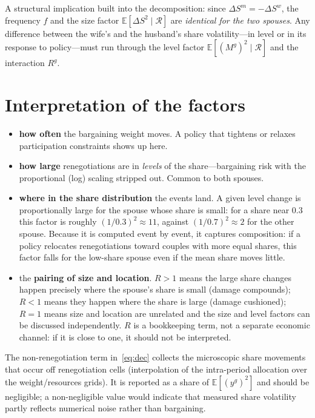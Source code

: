 \documentclass[11pt]{article}
\newcommand{\E}{\mathbb{E}}
\newcommand{\ren}{\mathcal{R}}
\begin{document}
A structural implication built into the decomposition: since
$\Delta S^m = -\Delta S^w$, the frequency $f$ and the size factor
$\E[\Delta S^2\mid\ren]$ are \emph{identical for the two spouses}. Any
difference between the wife's and the husband's share volatility---in level
or in its response to policy---must run through the level factor
$\E[(M^g)^2\mid\ren]$ and the interaction $R^g$.

\section{Interpretation of the factors}

\begin{itemize}
\item[{$f$:}] \textbf{how often} the bargaining weight moves. A policy that
  tightens or relaxes participation constraints shows up here.
\item[{$\E[\Delta S^2\mid\ren]$:}] \textbf{how large} renegotiations are in
  \emph{levels} of the share---bargaining risk with the proportional
  (log) scaling stripped out. Common to both spouses.
\item[{$\E[(M^g)^2\mid\ren]$:}] \textbf{where in the share distribution} the
  events land. A given level change is proportionally large for the spouse
  whose share is small: for a share near $0.3$ this factor is roughly
  $(1/0.3)^2 \approx 11$, against $(1/0.7)^2 \approx 2$ for the other
  spouse. Because it is computed event by event, it captures composition:
  if a policy relocates renegotiations toward couples with more equal
  shares, this factor falls for the low-share spouse even if the mean share
  moves little.
\item[{$R^g$:}] the \textbf{pairing of size and location}. $R>1$ means the
  large share changes happen precisely where the spouse's share is small
  (damage compounds); $R<1$ means they happen where the share is large
  (damage cushioned); $R=1$ means size and location are unrelated and the
  size and level factors can be discussed independently. $R$ is a
  bookkeeping term, not a separate economic channel: if it is close to one,
  it should not be interpreted.
\end{itemize}

The non-renegotiation term in~\eqref{eq:dec} collects the microscopic share
movements that occur off renegotiation cells (interpolation of the
intra-period allocation over the weight/resources grids). It is reported as
a share of $\E[(y^g)^2]$ and should be negligible; a non-negligible value
would indicate that measured share volatility partly reflects numerical
noise rather than bargaining.
\end{document}
